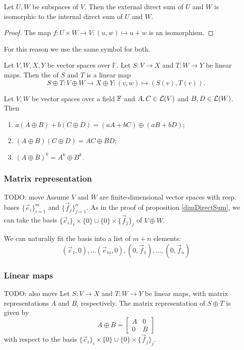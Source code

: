 \begin{proposition}
Let $U,W$ be subspaces of $V$. Then the external direct sum of $U$ and $W$ is isomorphic to the internal direct sum of $U$ and $W$.
\end{proposition}
\begin{proof}
The map $f: U\times W\to V: (u,w) \mapsto u+w$ is an isomorphism.
\end{proof}
For this reason we use the same symbol for both.

\begin{definition}
Let $V,W, X,Y$ be vector spaces over $\mathbb{F}$. Let $S: V\to X$ and $T: W\to Y$ be linear maps. Then the  of $S$ and $T$ is a linear map
\[ S\oplus T: V \oplus W \to X\oplus Y: (v,w) \mapsto (S(v), T(v)). \]
\end{definition}

\begin{lemma}
Let $V,W$ be vector spaces over a field $\mathbb{F}$ and $A,C\in\operatorname{\mathcal{L}}(V)$ and $B,D\in\operatorname{\mathcal{L}}(W)$. Then
\begin{enumerate}
\item $a(A\oplus B) + b(C\oplus D) = (aA+bC)\oplus (aB + bD)$;
\item $(A\oplus B)(C\oplus D) = AC\oplus BD$;
\item $(A\oplus B)^k = A^k\oplus B^k$.
\end{enumerate}
\end{lemma}

\subsubsection{Matrix representation}
TODO: move
Assume $V$ and $W$ are finite-dimensional vector spaces with resp. bases $\{\vec{e}_i\}_{i=1}^m$ and $\{\vec{f}_j\}_{j=1}^n$.
As in the proof of proposition \ref{dimDirectSum}, we can take the basis $\{\vec{e}_i\}_i\times\{0\} \cup \{0\}\times\{\vec{f}_j\}_j$ of $V\oplus W$.

We can naturally fit the basis into a list of $m+n$ elements:
\[ (\vec{e}_1,0),\ldots (\vec{e}_m, 0), (0, \vec{f}_1), \ldots, (0,\vec{f}_n)  \]
\subsubsection{Linear maps}
TODO: also move
Let $S: V\to X$ and $T:W\to Y$ be linear maps, with matrix representations $A$ and $B$, respectively. The matrix representation of $S\oplus T$ is given by
\[ A\oplus B = \begin{bmatrix}
A & 0 \\
0 & B
\end{bmatrix} \]
with respect to the basis $\{\vec{e}_i\}_i\times\{0\} \cup \{0\}\times\{\vec{f}_j\}_j$.

